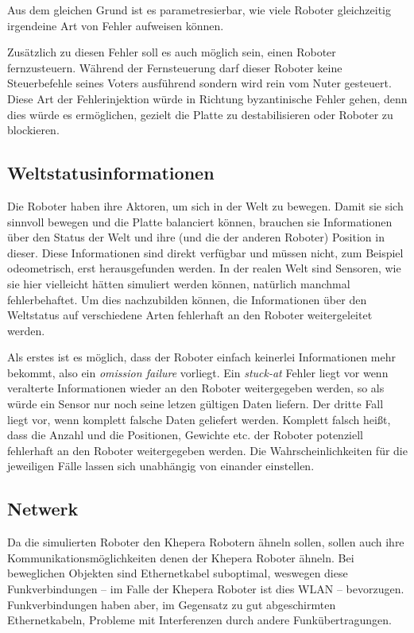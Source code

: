 Aus dem gleichen Grund ist es parametresierbar, wie viele Roboter gleichzeitig irgendeine Art von Fehler aufweisen k{\"{o}}nnen.

Zus{\"{a}}tzlich zu diesen Fehler soll es auch m{\"{o}}glich sein, einen Roboter fernzusteuern. W{\"{a}}hrend
der Fernsteuerung darf dieser Roboter keine Steuerbefehle seines Voters ausf{\"{u}}hrend sondern wird rein
vom Nuter gesteuert. Diese Art der Fehlerinjektion w{\"{u}}rde in Richtung byzantinische Fehler gehen,
denn dies w{\"{u}}rde es erm{\"{o}}glichen, gezielt die Platte zu destabilisieren oder Roboter zu
blockieren.

\subsection{Weltstatusinformationen}
Die Roboter haben ihre Aktoren, um sich in der Welt zu bewegen. Damit sie sich sinnvoll bewegen und die
Platte balanciert k{\"{o}}nnen, brauchen sie Informationen {\"{u}}ber den Status der Welt und ihre
(und die der anderen Roboter) Position in dieser. Diese Informationen sind direkt verf{\"{u}}gbar
und m{\"{u}}ssen nicht, zum Beispiel odeometrisch, erst herausgefunden werden. In der realen Welt sind
Sensoren, wie sie hier vielleicht h{\"{a}}tten simuliert werden k{\"{o}}nnen, nat{\"{u}}rlich manchmal 
fehlerbehaftet. Um dies nachzubilden k{\"{o}}nnen, die Informationen {\"{u}}ber den Weltstatus auf
verschiedene Arten fehlerhaft an den Roboter weitergeleitet werden.

Als erstes ist es m{\"{o}}glich, dass der Roboter einfach keinerlei Informationen mehr bekommt, also ein \textit{omission failure} vorliegt. Ein \textit{stuck-at} Fehler liegt
vor wenn veralterte Informationen wieder an den Roboter weitergegeben werden, so als w{\"{u}}rde ein Sensor nur noch seine letzen g{\"{u}}ltigen Daten liefern. Der dritte
Fall liegt vor, wenn komplett falsche Daten geliefert werden. Komplett falsch hei{\ss}t, dass die Anzahl und die Positionen, Gewichte etc. der Roboter potenziell fehlerhaft an
den Roboter weitergegeben werden. Die Wahrscheinlichkeiten f{\"{u}}r die jeweiligen F{\"{a}}lle lassen sich unabh{\"{a}}ngig von einander einstellen.

\subsection{Netwerk}
Da die simulierten Roboter den Khepera Robotern {\"{a}}hneln sollen, sollen auch ihre 
Kommunikationsm{\"{o}}glichkeiten denen der Khepera Roboter {\"{a}}hneln. Bei beweglichen
Objekten sind Ethernetkabel suboptimal, weswegen diese Funkverbindungen -- im Falle der Khepera
Roboter ist dies WLAN -- bevorzugen. Funkverbindungen haben aber, im Gegensatz zu gut abgeschirmten
Ethernetkabeln, Probleme mit Interferenzen durch andere Funk{\"{u}}bertragungen.

